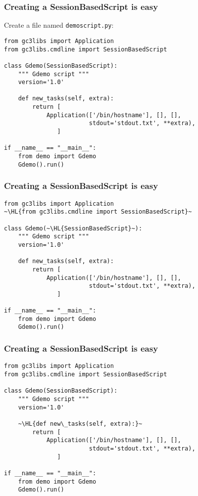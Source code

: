 \documentclass[english,serif,mathserif,xcolor=pdftex,dvipsnames,table]{beamer}
\begin{document}
\begin{frame}[fragile]
  \frametitle{Creating a SessionBasedScript is easy}
Create a file named \texttt{demoscript.py}:
\+
  \begin{lstlisting}
from gc3libs import Application
from gc3libs.cmdline import SessionBasedScript

class Gdemo(SessionBasedScript):
    """ Gdemo script """
    version='1.0'

    def new_tasks(self, extra):
        return [
            Application(['/bin/hostname'], [], [],
                        stdout='stdout.txt', **extra),
               ]

if __name__ == "__main__":
    from demo import Gdemo
    Gdemo().run()
  \end{lstlisting}
\end{frame}

\begin{frame}[fragile]
  \frametitle{Creating a SessionBasedScript is easy}
  \begin{lstlisting}
from gc3libs import Application
~\HL{from gc3libs.cmdline import SessionBasedScript}~

class Gdemo(~\HL{SessionBasedScript}~):
    """ Gdemo script """
    version='1.0'

    def new_tasks(self, extra):
        return [
            Application(['/bin/hostname'], [], [],
                        stdout='stdout.txt', **extra),
               ]

if __name__ == "__main__":
    from demo import Gdemo
    Gdemo().run()
  \end{lstlisting}
\end{frame}


\begin{frame}[fragile]
  \frametitle{Creating a SessionBasedScript is easy}
  \begin{lstlisting}
from gc3libs import Application
from gc3libs.cmdline import SessionBasedScript

class Gdemo(SessionBasedScript):
    """ Gdemo script """
    version='1.0'

    ~\HL{def new\_tasks(self, extra):}~
        return [
            Application(['/bin/hostname'], [], [],
                        stdout='stdout.txt', **extra),
               ]

if __name__ == "__main__":
    from demo import Gdemo
    Gdemo().run()
  \end{lstlisting}
\end{frame}
\end{document}
